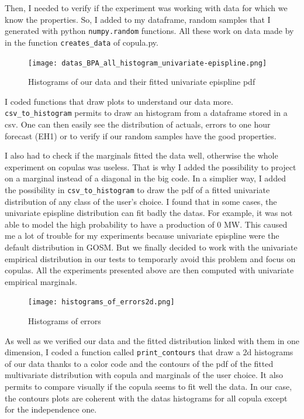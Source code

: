 \documentclass{article}
\begin{document}
Then, I needed to verify if the experiment was working with data for which we know the properties. So, I added to my dataframe, random samples that I generated with python \texttt{numpy.random} functions. All these work on data made by in the function \texttt{creates\_data} of copula.py.

\begin{figure}[H]
 \centering
    \texttt{[image: datas\_BPA\_all\_histogram\_univariate-epispline.png]}
    \centering
    \caption{Histograms of our data and their fitted univariate epispline pdf}
\end{figure}

I coded functions that draw plots to understand our data more. \texttt{csv\_to\_histogram} permits to draw an histogram from a dataframe stored in a csv. One can then easily see the distribution of actuals, errors to one hour forecast (EH1) or to verify if our random samples have the good properties.

I also had to check if the marginals fitted the data well, otherwise 
the whole experiment on copulas was useless. That is why I added the possibility to project on a marginal instead of a diagonal in the big code. In a simplier way, I added the possibility in \texttt{csv\_to\_histogram} to draw the pdf of a fitted univariate distribution of any class of the user's choice. I found that in some cases, the univariate epispline distribution can fit badly the datas. For example, it was not able to model the high probability to have a production of 0 MW. This caused me a lot of trouble for my experiments because univariate epispline were the default distribution in GOSM. But we finally decided to work with the univariate empirical distribution in our tests to temporarly avoid this problem and focus on copulas. All the experiments presented above are then computed with univariate empirical marginals.

\begin{figure}[H]  
    \texttt{[image: histograms\_of\_errors2d.png]}
    \centering
    \caption{Histograms of errors}
\end{figure}

As well as we verified our data and the fitted distribution linked with them in one dimension, I coded a function called \texttt{print\_contours} that draw a 2d histograms of our data thanks to a color code and the contours of the pdf of the fitted multivariate distribution with copula and marginals of the user choice. It also permits to compare visually if the copula seems to fit well the data. In our case, the contours plots are coherent with the datas histograms for all copula except for the independence one.
\end{document}

